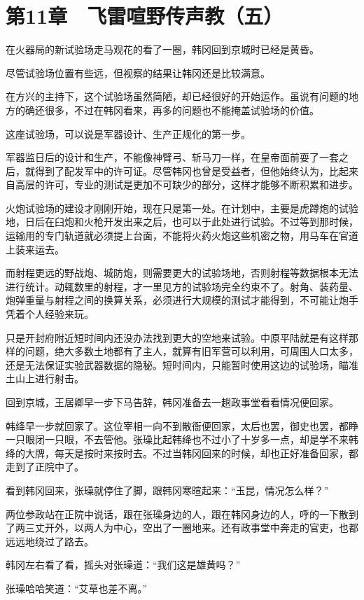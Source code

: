\section{第11章　飞雷喧野传声教（五）}

在火器局的新试验场走马观花的看了一圈，韩冈回到京城时已经是黄昏。

尽管试验场位置有些远，但视察的结果让韩冈还是比较满意。

在方兴的主持下，这个试验场虽然简陋，却已经很好的开始运作。虽说有问题的地方的确还很多，不过在韩冈看来，再多的问题也不能掩盖试验场的价值。

这座试验场，可以说是军器设计、生产正规化的第一步。

军器监日后的设计和生产，不能像神臂弓、斩马刀一样，在皇帝面前耍了一套之后，就得到了配发军中的许可证。尽管韩冈也曾是受益者，但他始终认为，比起来自高层的许可，专业的测试是更加不可缺少的部分，这样才能够不断积累和进步。

火炮试验场的建设才刚刚开始，现在只是第一处。在计划中，主要是虎蹲炮的试验地，日后在臼炮和火枪开发出来之后，也可以于此处进行试验。不过等到那时候，运输用的专门轨道就必须提上台面，不能将火药火炮这些机密之物，用马车在官道上装来运去。

而射程更远的野战炮、城防炮，则需要更大的试验场地，否则射程等数据根本无法进行统计。动辄数里的射程，才一里见方的试验场完全约束不了。射角、装药量、炮弹重量与射程之间的换算关系，必须进行大规模的测试才能得到，不可能让炮手凭着个人经验来玩。

只是开封府附近短时间内还没办法找到更大的空地来试验。中原平陆就是有这样那样的问题，绝大多数土地都有了主人，就算有旧军营可以利用，可周围人口太多，还是无法保证实验武器数据的隐秘。短时间内，只能暂时使用这边的试验场，瞄准土山上进行射击。

回到京城，王居卿早一步下马告辞，韩冈准备去一趟政事堂看看情况便回家。

韩绛早一步就回家了。这位宰相一向不到散衙便回家，太后也罢，御史也罢，都睁一只眼闭一只眼，不去管他。张璪比起韩绛也不过小了十岁多一点，却是学不来韩绛的大牌，每天是按时来按时去。不过当韩冈回来的时候，却也正好准备回家，都走到了正院中了。

看到韩冈回来，张璪就停住了脚，跟韩冈寒暄起来：“玉昆，情况怎么样？”

两位参政站在正院中说话，跟在张璪身边的人，跟在韩冈身边的人，呼的一下散到了两三丈开外，以两人为中心，空出了一圈地来。还有政事堂中奔走的官吏，也都远远地绕过了路去。

韩冈左右看了看，摇头对张璪道：“我们这是雄黄吗？”

张璪哈哈笑道：“艾草也差不离。”


